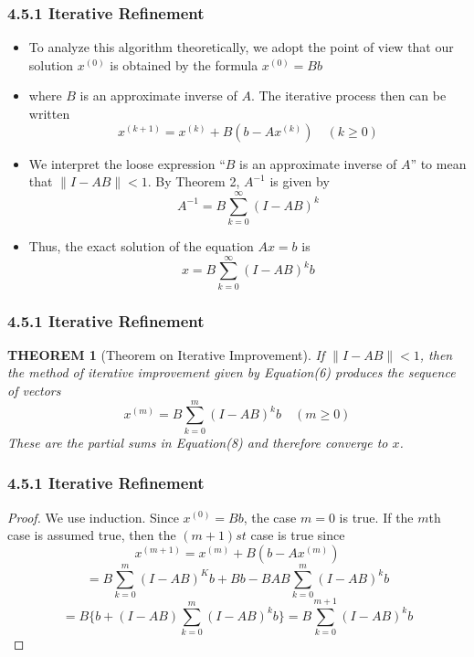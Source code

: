 \documentclass[notheorems,mathserif,table,compress]{beamer}  %
\begin{document}
\begin{frame}
  \frametitle{4.5.1 Iterative Refinement}
  \begin{itemize}
  \item To analyze this algorithm theoretically, we adopt the point of view that our solution $x^{(0)}$ is obtained by the formula $x^{(0)}=Bb$\\
  \item where $B$ is an approximate inverse of $A$. The iterative process then can be written
  \begin{equation}
  x^{(k+1)}=x^{(k)}+B(b-Ax^{(k)}) \quad (k \ge 0)
  \end{equation}
  \item We interpret the loose expression ``$B$ is an approximate inverse of $A$'' to mean that $\parallel I-AB\parallel <1$. By Theorem 2, $A^{-1}$ is given by 
  \begin{equation}
  A^{-1}=B\sum_{k=0}^{\infty}(I-AB)^k 
  \end{equation}
  \item Thus, the exact solution of the equation $Ax=b$ is
  \begin{equation}
  x=B\sum_{k=0}^{\infty}(I-AB)^kb
  \end{equation}
  \end{itemize}
\end{frame}


\begin{frame}
  \frametitle{4.5.1 Iterative Refinement}
  \newtheorem{theorem5}[theorem]{THEOREM}
  \begin{theorem5}[Theorem on Iterative Improvement]
  If $\parallel I-AB\parallel<1$, then the method of iterative improvement given by Equation(6) produces the sequence of vectors
  \[ x^{(m)}=B\sum_{k=0}^{m}(I-AB)^kb \quad (m\ge0) \]
  These are the partial sums in Equation(8) and therefore converge to $x$.
  \end{theorem5}
\end{frame}


\begin{frame}
  \frametitle{4.5.1 Iterative Refinement}
  \begin{proof}
  We use induction. Since $x^{(0)}=Bb$, the case $m=0$ is true. If the $m$th case is assumed true, then the $(m+1)st$ case is true since
  \[ x^{(m+1)}=x^{(m)}+B(b-Ax^{(m)}) \]
  \[ =B\sum_{k=0}^{m}(I-AB)^Kb+Bb-BAB\sum_{k=0}^{m}(I-AB)^kb \]
  \[ =B\Big\{ b+(I-AB)\sum_{k=0}^{m}(I-AB)^kb\Big\}=B\sum_{k=0}^{m+1}(I-AB)^kb \]
  \end{proof}
\end{frame}
\end{document}
